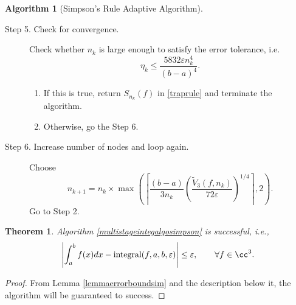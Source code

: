 \documentclass[draft]{iitthesis}
\newtheorem{theorem}{Theorem}
\theoremstyle{definition}
\newtheorem{algo}{Algorithm}
\theoremstyle{remark}
\begin{document}
\begin{algo} [Simpson's Rule Adaptive Algorithm]
\begin{description}
\item[Step 5. Check for convergence.] Check whether $n_k$ is large enough to satisfy the error tolerance, i.e.
    \begin{equation*}
        \eta_{k} \le \frac{5832\varepsilon n_k^4}{(b-a)^4}.
    \end{equation*}

    \begin{enumerate}[label=\alph*)]
      \item If this is true, return $S_{n_k}(f)$ in \eqref{traprule} and terminate the algorithm.
      \item Otherwise, go the Step 6.
    \end{enumerate}


\item[Step 6. Increase number of nodes and loop again.] Choose
$$
n_{k+1}=n_k\times\max\left(\left\lceil\frac{(b-a)}{3n_{k}}\left(\frac{\widetilde{V}_3(f,n_k)}{72\varepsilon}\right)^{1/4}\right\rceil,2\right).
$$
Go to Step 2.
\end{description}
\end{algo}

\begin{theorem}\label{thmSimpson}
    Algorithm \ref{multistageintegalgosimpson} is successful, i.e.,
    \begin{equation*}
      \left|\int_{a}^{b}f(x)dx-\textup{integral}(f,a,b,\varepsilon)\right|\le\varepsilon, \qquad \forall f\in \cc^3.
    \end{equation*}
\end{theorem}
\begin{proof}
 From Lemma \ref{lemmaerrorboundsim} and the description below it, the algorithm will be guaranteed to success.
\end{proof}
\end{document}
